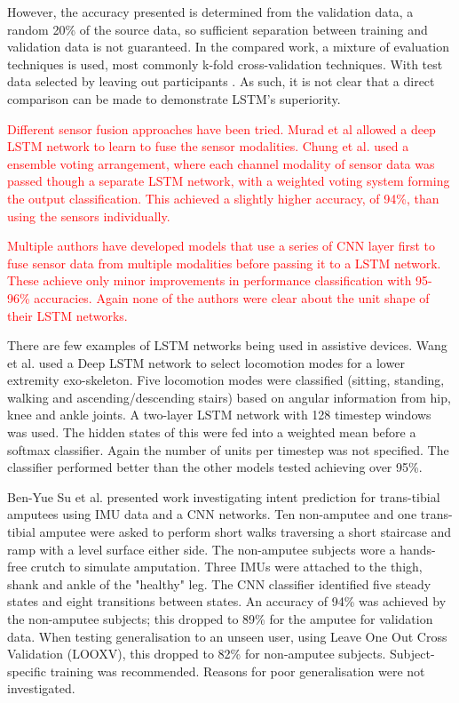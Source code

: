 \documentclass[sensors,article,submit,moreauthors,pdftex]{Definitions/mdpi}
\begin{document}
However, the accuracy presented is determined from the validation data, a random 20\% of the source data, so sufficient separation between training and validation data is not guaranteed. In the compared work, a mixture of evaluation techniques is used, most commonly k-fold cross-validation techniques. With test data selected by leaving out participants \cite{Koller2018, Sprager2015}. As such, it is not clear that a direct comparison can be made to demonstrate LSTM's superiority.

\textcolor{red}{Different sensor fusion approaches have been tried. Murad et al allowed a deep LSTM network to learn to fuse the sensor modalities\cite{Murad2017}. Chung et al. used a ensemble voting arrangement, where each channel modality of sensor data was passed though a separate LSTM network, with a weighted voting system forming the output classification\cite{Chung2019}. This achieved a slightly higher accuracy, of 94\%, than using the sensors individually.}

\textcolor{red}{Multiple authors have developed models that use a series of CNN layer first to fuse sensor data from multiple modalities before passing it to a LSTM network\cite{Abbaspour2020, Ihianle2020, Mutegeki2020, Wang2020, Mekruksavanich2020}. These achieve only minor improvements in performance classification with 95-96\% accuracies. Again none of the authors were clear about the unit shape of their LSTM networks.}

There are few examples of LSTM networks being used in assistive devices. Wang et al. used a Deep LSTM network to select locomotion modes for a lower extremity exo-skeleton\cite{Wang2018}. Five locomotion modes were classified (sitting, standing, walking and ascending/descending stairs) based on angular information from hip, knee and ankle joints. A two-layer LSTM network with 128 timestep windows was used. The hidden states of this were fed into a weighted mean before a softmax classifier. Again the number of units per timestep was not specified. The classifier performed better than the other models tested achieving over 95\%.

Ben-Yue Su et al. presented work investigating intent prediction for trans-tibial amputees using IMU data and a CNN networks\cite{Su2019}. Ten non-amputee and one trans-tibial amputee were asked to perform short walks traversing a short staircase and ramp with a level surface either side. The non-amputee subjects wore a hands-free crutch to simulate amputation. Three IMUs were attached to the thigh, shank and ankle of the "healthy" leg. The CNN classifier identified five steady states and eight transitions between states. An accuracy of 94\% was achieved by the non-amputee subjects; this dropped to 89\% for the amputee for validation data. When testing generalisation to an unseen user, using Leave One Out Cross Validation (LOOXV), this dropped to 82\% for non-amputee subjects. Subject-specific training was recommended. Reasons for poor generalisation were not investigated.
\end{document}
